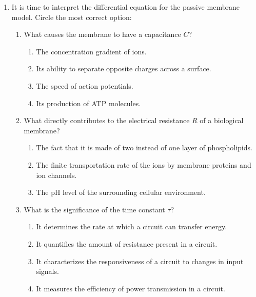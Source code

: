 \documentclass[11pt,letterpaper]{article}
\begin{document}
\begin{enumerate}
    \item It is time to interpret the differential equation for the passive membrane model. Circle the most correct option:
    \begin{enumerate}
        \item What causes the membrane to have a capacitance $C$?
        \begin{enumerate}
            \item The concentration gradient of ions.
            \item Its ability to separate opposite charges across a surface.
            \item The speed of action potentials.
            \item Its production of ATP molecules.
        \end{enumerate}
        \item What directly contributes to the electrical resistance $R$ of a biological membrane?
        \begin{enumerate}
            \item The fact that it is made of two instead of one layer of phospholipids.
            \item The finite transportation rate of the ions by membrane proteins and ion channels.
            \item The pH level of the surrounding cellular environment.
        \end{enumerate}
        \item What is the significance of the time constant $\tau$?
        \begin{enumerate}
            \item It determines the rate at which a circuit can transfer energy.
            \item It quantifies the amount of resistance present in a circuit.
            \item It characterizes the responsiveness of a circuit to changes in input signals.
            \item It measures the efficiency of power transmission in a circuit.
        \end{enumerate}

\end{enumerate}
\end{enumerate}
\end{document}
